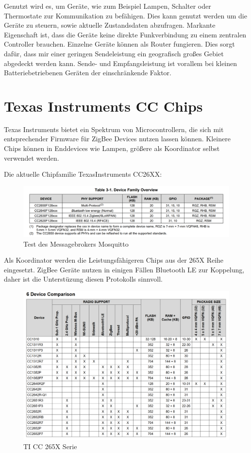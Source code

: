 Genutzt wird es, um Geräte, wie zum Beispiel Lampen, Schalter oder Thermostate
zur Kommunikation zu befähigen. Dies kann genutzt werden um die Geräte zu steuern, sowie aktuelle Zustandsdaten abzufragen. 
Markante Eigenschaft ist, dass die Geräte keine direkte Funkverbindung
zu einem zentralen Controller brauchen. Einzelne Geräte können als Router fungieren. Dies sorgt dafür,
dass mir einer geringen Sendeleistung ein geografisch großes Gebiet abgedeckt werden kann. Sende- und Empfangsleistung
ist vorallem bei kleinen Batteriebetriebenen Geräten der einschränkende Faktor.


\section{Texas Instruments CC Chips}

Texas Instruments bietet ein Spektrum von Microcontrollern, die sich mit entsprechender Firmware für ZigBee Devices 
nutzen lassen können. Kleinere Chips können in Enddevices wie Lampen, größere als Koordinator selbst verwendet werden.

Die aktuelle Chipfamilie TexasInstruments CC26XX:

\begin{figure}[H]
  \centering
  \includegraphics[width=1\textwidth]{media/table26xx.png}
  \caption{Test des Messagebrokers Mosquitto}
\end{figure}

Als Koordinator werden die Leistungsfähigeren Chips aus der 265X Reihe eingesetzt. ZigBee Geräte nutzen in einigen
Fällen Bluetooth LE zur Koppelung, daher ist die Unterstüzung diesen Protokolls sinnvoll.

\begin{figure}[H]
  \centering
  \includegraphics[width=1\textwidth]{media/table265x.png}
  \caption{TI CC 265X Serie}
\end{figure}

